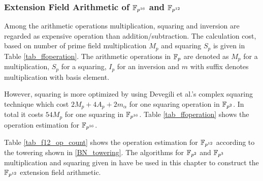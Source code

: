 \subsubsection{Extension Field Arithmetic  of \texorpdfstring{$\FPSN$}{} and \texorpdfstring{$\FPTV$}{}}
Among the arithmetic operations multiplication, squaring and inversion are regarded as expensive operation than addition/subtraction. The calculation cost, based on number of prime field multiplication $M_p$ and squaring $S_p$ is given in Table \ref{tab_ffoperation}. The arithmetic operations in ${\mathbb{F}}_{p}$ are denoted as $M_p$ for a multiplication, $S_p$ for a squaring, $I_p$ for an inversion and $m$ with suffix denotes multiplication with basis element.
\begin{table*}[ht]
\caption{Number of arithmetic operations in  $\FPSN$ based on \eqref{towering}.}
\label{tab_ffoperation}
\centering
{}
\end{table*}
However, squaring is more optimized by using Devegili et al.'s \cite{EPRINT:DOSD06} complex squaring technique which cost $2M_p+4A_p+2m_\alpha$ for one squaring operation in $\mathbb{F}_{p^2}$. In total it costs $54M_p$ for one squaring in $\FPSN$. Table \ref{tab_ffoperation} shows the operation estimation for $\FPSN$.

Table \ref{tab_f12_op_count} shows the operation estimation for $\FPTV$ according to the towering shown in \eqref{BN_towering}. The algorithms for $\mathbb{F}_{p^2}$ and $\mathbb{F}_{p^3}$ multiplication and squaring given in \cite{EPRINT:DEHR15} have be used in this chapter to construct the $\FPTV$ extension field arithmetic. 

\begin{table*}[ht]
\caption{Number of arithmetic operations in $\FPTV$ based on \eqref{BN_towering}.}
\label{tab_f12_op_count}
\centering
{}
\end{table*}

